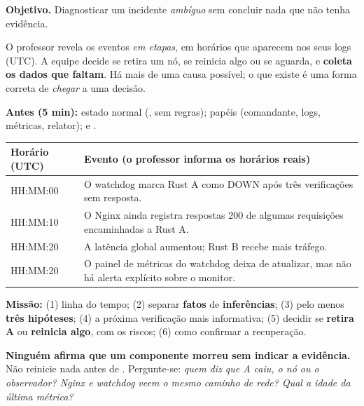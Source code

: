 
\textbf{Objetivo.} Diagnosticar um incidente \emph{ambíguo} sem concluir nada que não tenha evidência.

\begin{ideia}
O professor revela os eventos \emph{em etapas}, em horários que aparecem nos seus logs (UTC). A equipe decide se retira
um nó, se reinicia algo ou se aguarda, e \textbf{coleta os dados que faltam}. Há mais de uma causa possível; o que
existe é uma forma correta de \emph{chegar} a uma decisão.
\end{ideia}

\textbf{Antes (5 min):} estado normal (,  sem regras); papéis
(comandante, logs, métricas, relator);  e .

\begin{center}
\begin{tabularx}{\linewidth}{@{}>{\ttfamily}lX@{}}
\toprule
\textbf{Horário (UTC)} & \textbf{Evento (o professor informa os horários reais)}\\ \midrule
HH:MM:00 & O watchdog marca Rust A como DOWN após três verificações sem resposta.\\
HH:MM:10 & O Nginx ainda registra respostas 200 de algumas requisições encaminhadas a Rust A.\\
HH:MM:20 & A latência global aumentou; Rust B recebe mais tráfego.\\
HH:MM:20 & O painel de métricas do watchdog deixa de atualizar, mas não há alerta explícito sobre o monitor.\\ \bottomrule
\end{tabularx}
\end{center}

\textbf{Missão:} (1) linha do tempo; (2) separar \textbf{fatos} de \textbf{inferências}; (3) pelo menos
\textbf{três hipóteses}; (4) a próxima verificação mais informativa; (5) decidir se \textbf{retira A} ou
\textbf{reinicia algo}, com os riscos; (6) como confirmar a recuperação.

\begin{perigo}
\textbf{Ninguém afirma que um componente morreu sem indicar a evidência.} Não reinicie nada antes de
. Pergunte-se: \emph{quem diz que A caiu, o nó ou o observador? Nginx e
watchdog veem o mesmo caminho de rede? Qual a idade da última métrica?}
\end{perigo}

